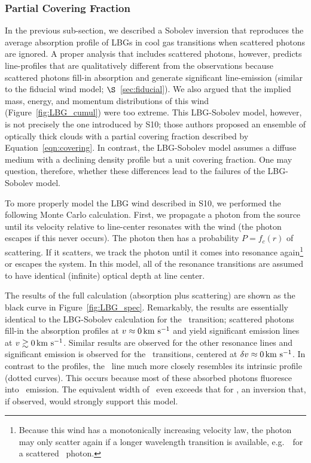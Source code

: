\documentclass[12pt,preprint]{aastex}
\begin{document}
\subsubsection{Partial Covering Fraction}
\label{sec:Covering}

In the previous sub-section, we described a Sobolev inversion that
reproduces the average absorption profile of LBGs in cool gas
transitions when scattered photons are ignored.  A proper analysis
that includes scattered photons,
however, predicts line-profiles that are qualitatively
different from the observations because scattered photons fill-in
absorption and generate significant line-emission (similar to the
fiducial wind model; $\S$~\ref{sec:fiducial}).
We also argued that the implied mass, energy, and momentum
distributions of this wind (Figure~\ref{fig:LBG_cumul}) were too
extreme. 
This LBG-Sobolev model, however, is not precisely
the one introduced by S10;  those authors proposed an ensemble of optically
thick clouds with a partial covering fraction described by
Equation~\ref{eqn:covering}.  In contrast, the LBG-Sobolev model assumes
a diffuse medium with a declining density profile but a unit covering
fraction.  One may question, therefore,  whether these differences
lead to the failures of the LBG-Sobolev model. 

To more properly model the LBG wind described in S10, we 
performed the following Monte Carlo calculation.  First, we propagate
a photon from the source until its velocity relative to line-center
resonates with the wind (the photon escapes if this never occurs).
The photon then has a probability $P = f_c(r)$ of scattering.  If it
scatters, we track the photon until it comes into
resonance again\footnote{Because this wind has a monotonically
  increasing velocity law, the photon may only scatter again if a
  longer wavelength transition is available, e.g.\ \mgiib\ for a
  scattered \mgiia\ photon.} or escapes the system.  In this model, all of the
resonance transitions are assumed to have identical (infinite) optical
depth at line center. 

The results of the full calculation (absorption plus scattering) are
shown as the black curve in Figure~\ref{fig:LBG_spec}.  Remarkably, the results
are essentially identical to the LBG-Sobolev calculation for the
\mgiia\ transition; scattered photons fill-in
the absorption profiles at $v \approx 0 \, {\rm km~s^{-1}}$ and yield significant
emission lines at $v \gtrsim 0 \, {\rm km~s^{-1}}$. 
Similar results are observed for the other resonance lines and  
significant emission is observed 
for the \feiis\ transitions, centered at $\delta v \approx 0 \, {\rm km~s^{-1}}$.  
In contrast to the  profiles, the 
\feiia\ line much more closely resembles its intrinsic
profile (dotted curves).  This occurs because most of these
absorbed photons fluoresce into \feiis\ emission.
The equivalent width of \feiia\ even exceeds that for \feiib, an
inversion that, if observed, would strongly support this model.
\end{document}
